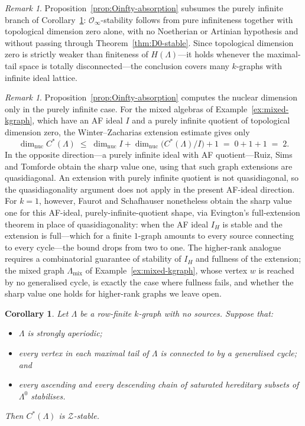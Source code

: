 \documentclass[12pt]{amsart}
\theoremstyle{plain}
\newtheorem{corollary}[theorem]{Corollary}
\theoremstyle{definition}
\theoremstyle{remark}
\newtheorem{remark}[theorem]{Remark}
\begin{document}
\begin{remark}
Proposition~\ref{prop:Oinfty-absorption} subsumes the purely infinite branch of
Corollary~\ref{cor:Z-stable}: $\mathcal O_\infty$-stability follows from pure
infiniteness together with topological dimension zero alone, with no
Noetherian or Artinian hypothesis and without passing through
Theorem~\ref{thm:D0-stable}. Since topological dimension zero is strictly
weaker than finiteness of $H(\Lambda)$---it holds whenever the maximal-tail
space is totally disconnected---the conclusion covers many $k$-graphs with
infinite ideal lattice.
\end{remark}

\begin{remark}\label{rem:mixed-nucdim}
Proposition~\ref{prop:Oinfty-absorption} computes the nuclear dimension only in
the purely infinite case. For the mixed algebras of
Example~\ref{ex:mixed-kgraph}, which have an AF ideal $I$ and a purely infinite
quotient of topological dimension zero, the Winter--Zacharias extension estimate
\cite{WZ} gives only
\[
\dim_{\mathrm{nuc}} C^*(\Lambda)
  \;\le\; \dim_{\mathrm{nuc}} I + \dim_{\mathrm{nuc}}\big(C^*(\Lambda)/I\big) + 1
  \;=\; 0 + 1 + 1 \;=\; 2 .
\]
In the opposite direction---a purely infinite ideal with AF quotient---Ruiz,
Sims and Tomforde \cite[Theorem~6.1]{RST} obtain the sharp value one, using that
such graph extensions are quasidiagonal. An extension with purely infinite
quotient is not quasidiagonal, so the quasidiagonality argument does not apply
in the present AF-ideal direction. For $k=1$, however, Faurot and Schafhauser
\cite[Theorem~B]{FS} nonetheless obtain the sharp value one for this
AF-ideal, purely-infinite-quotient shape, via Evington's full-extension theorem
\cite{Ev} in place of quasidiagonality: when the AF ideal $I_H$ is stable and
the extension is full---which for a finite $1$-graph amounts to every source
connecting to every cycle---the bound drops from two to one. The higher-rank
analogue requires a combinatorial guarantee of stability of $I_H$ and fullness
of the extension; the mixed graph $\Lambda_{\mathrm{mix}}$ of
Example~\ref{ex:mixed-kgraph}, whose vertex $w$ is reached by no generalised
cycle, is exactly the case where fullness fails, and whether the sharp value one
holds for higher-rank graphs we leave open.
\end{remark}


\begin{corollary}\label{cor:Z-stable}%
Let $\Lambda$ be a row-finite $k$-graph with no sources. Suppose that:
\begin{itemize}
  \item $\Lambda$ is strongly aperiodic;
  \item every vertex in each maximal tail of $\Lambda$ is connected to by a generalised cycle; and
  \item every ascending and every descending chain of saturated hereditary subsets of $\Lambda^0$ stabilises.
\end{itemize}
Then $C^*(\Lambda)$ is $\mathcal{Z}$-stable.
\end{corollary}
\end{document}
